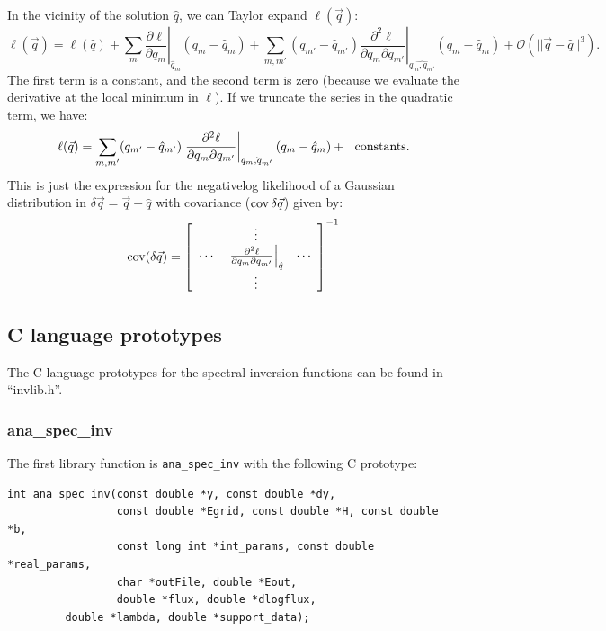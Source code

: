 \documentclass{article}    %
\newcommand{\cov}{\mathop{{\rm cov}}}
\begin{document}
In the vicinity of the solution $\hat{q}$, we can Taylor expand $\ell(\vec{q})$:
\begin{equation}
\ell(\vec{q}) = \ell(\hat{q}) + 
\sum_m \left.\frac{\partial \ell}{\partial q_m}\right|_{\hat{q}_m}(q_m-\hat{q}_m) + 
\sum_{m,m'} (q_{m'}-\hat{q}_{m'})\left.\frac{\partial^2 \ell}{\partial q_m \partial q_{m'}}\right|_{\hat{q_m,q_{m'}}}(q_m-\hat{q}_m) + \mathcal{O}(||\vec{q}-\hat{q}||^3).
\end{equation}
The first term is a constant, and the second term is zero (because we evaluate the derivative at the local minimum in $\ell$). If we truncate
the series in the quadratic term, we have:
\begin{equation}
\ell(\vec{q}) = \sum_{m,m'} (q_{m'}-\hat{q}_{m'})\left.\frac{\partial^2 \ell}{\partial q_m \partial q_{m'}}\right|_{\hat{q_m,q_{m'}}}(q_m-\hat{q}_m) + {\rm ~~ constants}.
\end{equation}
This is just the expression for the negativelog likelihood of a
Gaussian distribution in $\delta\vec{q} = \vec{q}-\hat{q}$ with
covariance ($\cov{\delta\vec{q}}$) given by:
\begin{equation}
\cov(\delta\vec{q}) = \left[
\begin{array}{ccc}
~ & \vdots & ~ \\
\cdots & \left.
\frac{\partial^2 \ell}{\partial q_m \partial q_{m'}}
\right|_{\hat{q}}
& \cdots \\
~ & \vdots & ~ 
\end{array}
\right]^{-1}
\end{equation}

\subsection{C language prototypes}

The C language prototypes for the spectral inversion functions can be
found in ``invlib.h''.

\subsubsection{ana\_spec\_inv}

The first library function is \verb|ana_spec_inv| with the following C prototype:
\begin{verbatim}
int ana_spec_inv(const double *y, const double *dy, 
                 const double *Egrid, const double *H, const double *b,
                 const long int *int_params, const double *real_params,
                 char *outFile, double *Eout, 
                 double *flux, double *dlogflux, 
		 double *lambda, double *support_data);
\end{verbatim}
                  
\end{document}
